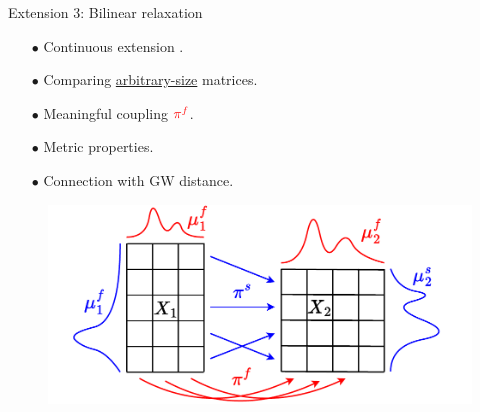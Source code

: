 \documentclass{beamer}
\newcommand{\pif}{{\color{red}{\pi^f}}}
\begin{document}
\begin{frame}{Extension 3: Bilinear relaxation}
\vspace{-0.3cm}
\begin{minipage}[t]{0.6\linewidth}
  \begin{itemize}
    \item[$\bullet$] Continuous extension \parencite{Chowdhury21b}.
    \item[$\bullet$] Comparing \underline{arbitrary-size} matrices.
    \item[$\bullet$] Meaningful {\color{red}{feature}} coupling $\pif$.
    \item[$\bullet$] Metric properties.
    \item[$\bullet$] Connection with GW distance.
  \end{itemize}
  \end{minipage}%
  \hfill%
  \hspace{-6cm}
  \begin{minipage}[t]{0.55\linewidth}
    \vspace{0.5cm}
  \begin{figure}
    \centering
    \includegraphics[width=1.15\linewidth, keepaspectratio=true]{OT_new/coot_matrix_ot.pdf}
  \end{figure}
\end{minipage}

\end{frame}
\end{document}
